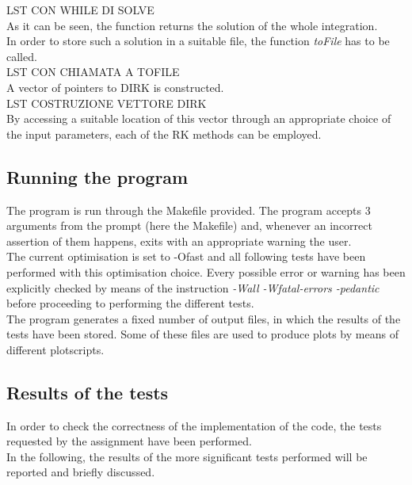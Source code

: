 \documentclass[11pt]{article}
\theoremstyle{theorem}
\theoremstyle{definition}
\begin{document}
LST CON WHILE DI SOLVE\\

As it can be seen, the function returns the solution of the whole integration.\\
In order to store such a solution in a suitable file, the function \emph{toFile} has to be called.\\

LST CON CHIAMATA A TOFILE\\

A vector of pointers to DIRK is constructed.\\

LST COSTRUZIONE VETTORE DIRK\\

By accessing a suitable location of this vector through an appropriate choice of the input parameters, each of the RK methods can be employed.\\

\subsection{Running the program}
The program is run through the Makefile provided.
The program accepts 3 arguments from the prompt (here the Makefile) and, whenever an incorrect assertion of them happens, exits with an appropriate warning the user.\\
The current optimisation is set to -Ofast and all following tests have been performed with this optimisation choice. Every possible error or warning has been explicitly checked by means of the instruction \emph{-Wall -Wfatal-errors -pedantic} before proceeding to performing the different tests.\\
The program generates a fixed number of output files, in which the results of the tests have been stored. Some of these files are used to produce plots by means of different plotscripts.\\

\subsection{Results of the tests}
In order to check the correctness of the implementation of the code, the tests requested by the assignment have been performed.\\
In the following, the results of the more significant tests performed will be reported and briefly discussed.\\
\end{document}
